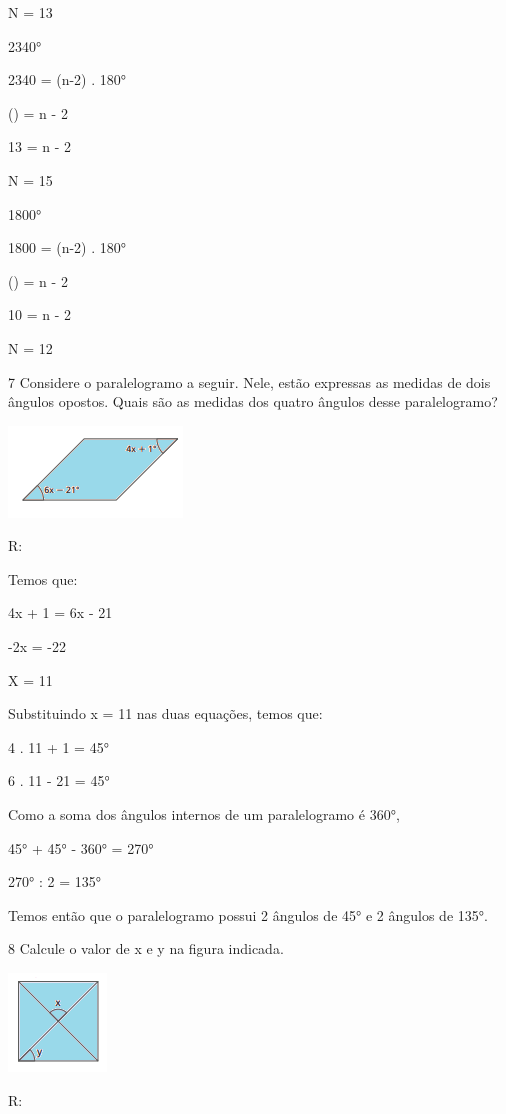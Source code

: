 {N = 13
\item 2340°

2340 = (n-2) . 180°

() = n - 2

13 = n - 2

N = 15
\item 1800°

1800 = (n-2) . 180°

() = n - 2

10 = n - 2

N = 12

\num{7} Considere o paralelogramo a seguir. Nele, estão expressas as medidas
de dois ângulos opostos. Quais são as medidas dos quatro ângulos desse
paralelogramo?

\includegraphics[width=1.82292in,height=0.95833in]{./imgSAEB_8_MAT/media/image9.png}

R:

Temos que:

4x + 1 = 6x - 21

-2x = -22

X = 11

Substituindo x = 11 nas duas equações, temos que:

4 . 11 + 1 = 45°

6 . 11 - 21 = 45°

Como a soma dos ângulos internos de um paralelogramo é 360°,

45° + 45° - 360° = 270°

270° : 2 = 135°

Temos então que o paralelogramo possui 2 ângulos de 45° e 2 ângulos de
135°.

\num{8} Calcule o valor de x e y na figura indicada.

\includegraphics[width=1.03125in,height=1.03125in]{./imgSAEB_8_MAT/media/image10.png}

R:

}
